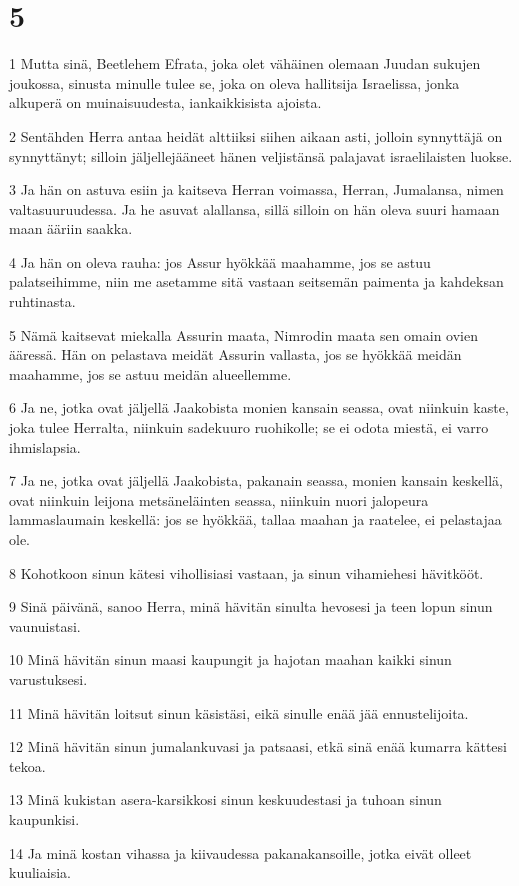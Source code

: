 \chapter{5}

\par 1 Mutta sinä, Beetlehem Efrata, joka olet vähäinen olemaan Juudan sukujen joukossa, sinusta minulle tulee se, joka on oleva hallitsija Israelissa, jonka alkuperä on muinaisuudesta, iankaikkisista ajoista.
\par 2 Sentähden Herra antaa heidät alttiiksi siihen aikaan asti, jolloin synnyttäjä on synnyttänyt; silloin jäljellejääneet hänen veljistänsä palajavat israelilaisten luokse.
\par 3 Ja hän on astuva esiin ja kaitseva Herran voimassa, Herran, Jumalansa, nimen valtasuuruudessa. Ja he asuvat alallansa, sillä silloin on hän oleva suuri hamaan maan ääriin saakka.
\par 4 Ja hän on oleva rauha: jos Assur hyökkää maahamme, jos se astuu palatseihimme, niin me asetamme sitä vastaan seitsemän paimenta ja kahdeksan ruhtinasta.
\par 5 Nämä kaitsevat miekalla Assurin maata, Nimrodin maata sen omain ovien ääressä. Hän on pelastava meidät Assurin vallasta, jos se hyökkää meidän maahamme, jos se astuu meidän alueellemme.
\par 6 Ja ne, jotka ovat jäljellä Jaakobista monien kansain seassa, ovat niinkuin kaste, joka tulee Herralta, niinkuin sadekuuro ruohikolle; se ei odota miestä, ei varro ihmislapsia.
\par 7 Ja ne, jotka ovat jäljellä Jaakobista, pakanain seassa, monien kansain keskellä, ovat niinkuin leijona metsäneläinten seassa, niinkuin nuori jalopeura lammaslaumain keskellä: jos se hyökkää, tallaa maahan ja raatelee, ei pelastajaa ole.
\par 8 Kohotkoon sinun kätesi vihollisiasi vastaan, ja sinun vihamiehesi hävitkööt.
\par 9 Sinä päivänä, sanoo Herra, minä hävitän sinulta hevosesi ja teen lopun sinun vaunuistasi.
\par 10 Minä hävitän sinun maasi kaupungit ja hajotan maahan kaikki sinun varustuksesi.
\par 11 Minä hävitän loitsut sinun käsistäsi, eikä sinulle enää jää ennustelijoita.
\par 12 Minä hävitän sinun jumalankuvasi ja patsaasi, etkä sinä enää kumarra kättesi tekoa.
\par 13 Minä kukistan asera-karsikkosi sinun keskuudestasi ja tuhoan sinun kaupunkisi.
\par 14 Ja minä kostan vihassa ja kiivaudessa pakanakansoille, jotka eivät olleet kuuliaisia.

